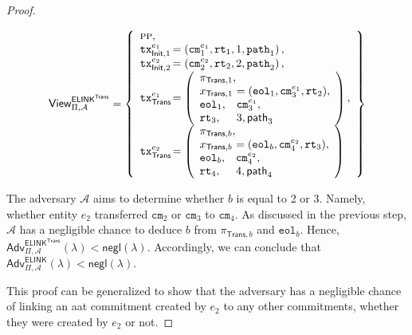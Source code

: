 \begin{proof}
\begin{figure}[!h]
{\begin{minipage}{\linewidth}
    \begin{align*}
    \mathsf{View}^{\mathsf{ELINK}^\mathsf{Trans}}_{\Pi, \mathcal{A}} = \left\{
    \begin{array}{l@{\hspace{0.1em}}l}
        \textsc{pp}, & \\
        \texttt{tx}^{e_1}_{\mathsf{Init}, 1} & = \left( \texttt{cm}^{e_1}_1, \texttt{rt}_1, 1, \texttt{path}_1 \right), \\
        \texttt{tx}^{e_2}_{\mathsf{Init}, 2} & = \left( \texttt{cm}^{e_2}_2, \texttt{rt}_2, 2, \texttt{path}_2 \right), \\
         \texttt{tx}^{e_1}_\mathsf{Trans} & = \left( 
        \begin{array}{l@{\hspace{0.05em}}l}
            \pi_{\mathsf{Trans}, 1}, & \\
            x_{\mathsf{Trans}, 1} & = (\texttt{eol}_{1}, \texttt{cm}^{e_1}_{3}, \texttt{rt}_2) ,\\
            \texttt{eol}_{1}, & \texttt{cm}^{e_1}_{3}, \\
            \texttt{rt}_3, & 3,  \mathsf{path}_{3}
        \end{array} 
        \right), \\
        \texttt{tx}^{e_2}_\mathsf{Trans} & = \left( 
        \begin{array}{l@{\hspace{0.05em}}l}
            \pi_{\mathsf{Trans}, b}, & \\
            x_{\mathsf{Trans}, b} & = (\texttt{eol}_{b}, \texttt{cm}^{e_2}_{4}, \texttt{rt}_3) ,\\
            \texttt{eol}_{b}, & \texttt{cm}^{e_2}_{4}, \\
            \texttt{rt}_4, & 4, \mathsf{path}_{4}
        \end{array} 
        \right) \\
    \end{array} 
    \right\}
\end{align*}

    \end{minipage}
    }
\end{figure}





The adversary $\mathcal{A}$ aims to determine whether $b$ is equal to 2 or 3. Namely, whether entity $e_2$ transferred $\texttt{cm}_2$ or $\texttt{cm}_3$ to $\texttt{cm}_4$. As discussed in the previous step, $\mathcal{A}$ has a negligible chance to deduce $b$ from $\pi_{\mathsf{Trans}, b}$ and $\texttt{eol}_{b}$. Hence, $\mathsf{Adv}^{\mathsf{ELINK}^\textsf{Trans}}_{\Pi, \mathcal{A}}(\lambda) < \mathsf{negl}(\lambda)$. Accordingly, we can conclude that $\mathsf{Adv}^{\mathsf{ELINK}}_{\Pi, \mathcal{A}}(\lambda) < \mathsf{negl}(\lambda)$.

This proof can be generalized to show that the adversary has a negligible chance of linking an \gls{aat} commitment created by $e_2$ to any other commitments, whether they were created by $e_2$ or not.

\end{proof}

